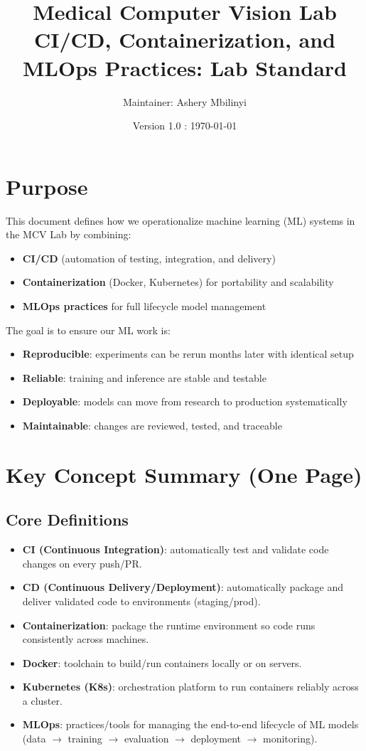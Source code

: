 \documentclass[11pt]{article}
\title{\textbf{Medical Computer Vision Lab \\ \small{
CI/CD, Containerization, and MLOps Practices: Lab Standard}}}
\author{Maintainer: Ashery Mbilinyi}
\date{Version 1.0 : \today}
\begin{document}
\maketitle

\tableofcontents
\newpage

\section{Purpose}
This document defines how we operationalize machine learning (ML) systems in the MCV Lab by combining:
\begin{itemize}
  \item \textbf{CI/CD} (automation of testing, integration, and delivery)
  \item \textbf{Containerization} (Docker, Kubernetes) for portability and scalability
  \item \textbf{MLOps practices} for full lifecycle model management
\end{itemize}

The goal is to ensure our ML work is:
\begin{itemize}
  \item \textbf{Reproducible}: experiments can be rerun months later with identical setup
  \item \textbf{Reliable}: training and inference are stable and testable
  \item \textbf{Deployable}: models can move from research to production systematically
  \item \textbf{Maintainable}: changes are reviewed, tested, and traceable
\end{itemize}

\section{Key Concept Summary (One Page)}
\subsection{Core Definitions}
\begin{itemize}
  \item \textbf{CI (Continuous Integration)}: automatically test and validate code changes on every push/PR.
  \item \textbf{CD (Continuous Delivery/Deployment)}: automatically package and deliver validated code to environments (staging/prod).
  \item \textbf{Containerization}: package the runtime environment so code runs consistently across machines.
  \item \textbf{Docker}: toolchain to build/run containers locally or on servers.
  \item \textbf{Kubernetes (K8s)}: orchestration platform to run containers reliably across a cluster.
  \item \textbf{MLOps}: practices/tools for managing the end-to-end lifecycle of ML models (data $\rightarrow$ training $\rightarrow$ evaluation $\rightarrow$ deployment $\rightarrow$ monitoring).
\end{itemize}
\end{document}

